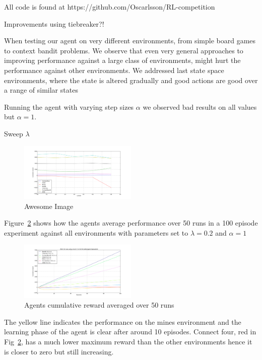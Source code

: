 All code is found at https://github.com/Oscarlsson/RL-competition

Improvements using tiebreaker?!

When testing our agent on very different environments, from simple board games to context bandit problems. We observe that even very general approaches to improving performance against a large class of environments, might hurt the performance against other environments. We addressed last state space environments, where the state is altered gradually and good actions are good over a range of similar states

Running the agent with varying step sizes $\alpha$ we observed bad results on all values but $\alpha=1$.


Sweep $\lambda$
\begin{figure}[h]
    \centering
    \includegraphics[width=0.5\textwidth]{../data/lambdasweepplot.png}
    \caption{Awesome Image}
    \label{fig:awesome_image}
\end{figure}


Figure~\ref{fig:cumreward} shows how the agents average performance over 50 runs in a 100 episode experiment against all environments with parameters set to $\lambda = 0.2$ and $\alpha = 1$

\begin{figure}[h!]
    \centering
    \includegraphics[width=0.5\textwidth]{../data/100episodes_50runs.png}
    \caption{Agents cumulative reward averaged over 50 runs}
    \label{fig:cumreward}
\end{figure}

The yellow line indicates the performance on the mines environment and the learning phase of the agent is clear after around 10 episodes. Connect four, red in Fig~\ref{fig:cumreward}, has a much lower maximum reward than the other environments hence it is closer to zero but still increasing.
